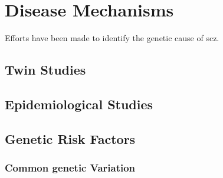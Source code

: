 \documentclass{book}
\begin{document}
	
	
	
	
	
	

	
	\section{Disease Mechanisms}
	Efforts have been made to identify the genetic cause of \acrlong{scz}.
	
	\subsection{Twin Studies}
	\subsection{Epidemiological Studies}
	\subsection{Genetic Risk Factors}
	\subsubsection{Common genetic Variation}
\end{document}
